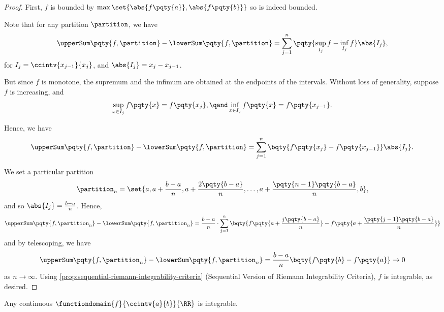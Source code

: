 \begin{proof}
    First, \(f\) is bounded by \(\max\set{\abs{f\pqty{a}}, \abs{f\pqty{b}}}\) so is indeed bounded.

    Note that for any partition \(\partition\), we have
    \[
        \upperSum\pqty{f, \partition} - \lowerSum\pqty{f, \partition} = \sum_{j = 1}^{n} \pqty{\sup_{I_j} f - \inf_{I_j} f} \abs{I_j},
    \]
    for \(I_j = \ccintv{x_{j - 1}}{x_j}\), and \(\abs{I_j} = x_j - x_{j - 1}\).

    But since \(f\) is monotone, the supremum and the infimum are obtained at the endpoints of the intervals. Without loss of generality, suppose \(f\) is increasing, and
    \[
        \sup_{x \in I_j} f\pqty{x} = f\pqty{x_j}, \qand \inf_{x \in I_j} f\pqty{x} = f\pqty{x_{j - 1}}.
    \]

    Hence, we have
    \[
        \upperSum\pqty{f, \partition} - \lowerSum\pqty{f, \partition} = \sum_{j = 1}^{n} \bqty{f\pqty{x_j} - f\pqty{x_{j - 1}}} \abs{I_j}.
    \]

    We set a particular partition
    \[
        \partition_n = \set{a, a + \frac{b - a}{n}, a + \frac{2\pqty{b - a}}{n}, \ldots, a + \frac{\pqty{n - 1} \pqty{b - a}}{n}, b},
    \]
    and so \(\abs{I_j} = \frac{b - a}{n}\). Hence,
    \[
        \upperSum\pqty{f, \partition_n} - \lowerSum\pqty{f, \partition_n} = \frac{b - a}{n} \cdot \sum_{j = 1}^{n} \bqty{f\pqty{a + \frac{j \pqty{b - a}}{n}} - f\pqty{a + \frac{\pqty{j - 1} \pqty{b - a}}{n}}}
    \]
    and by telescoping, we have
    \[
        \upperSum\pqty{f, \partition_n} - \lowerSum\pqty{f, \partition_n} = \frac{b - a}{n} \bqty{f\pqty{b} - f\pqty{a}} \to 0
    \]
    as \(n \to \infty\). Using \autoref{prop:sequential-riemann-integrability-criteria} (Sequential Version of Riemann Integrability Criteria), \(f\) is integrable, as desired.
\end{proof}

\begin{proposition}
    \label{prop:continuous-integrable}%
    Any continuous \(\functiondomain{f}{\ccintv{a}{b}}{\RR}\) is integrable.
\end{proposition}

